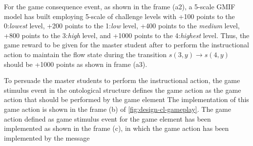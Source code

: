For the game consequence event, as shown in the frame (a2), a 5-scale GMIF model has built employing 5-scale of challenge levels with +100 points to the 0:\emph{lowest} level, +200 points to the 1:\emph{low} level, +400 points to the \emph{medium} level, +800 points to the 3:\emph{high} level, and +1000 points to the 4:\emph{highest} level.
Thus, the game reward to be given for the master student
after to perform the instructional action to maintain the flow state during the transition $s(3,y) \to s(4,y)$ should be
+1000 points as shown in frame (a3).

To persuade the master students to perform the instructional action, the game stimulus event in the ontological structure defines the game action  as the game action that should be performed by the game element 
The implementation of this game action is shown in the frame (b) of \autoref{fig:design-cl-gameplay}.
The game action  defined as game stimulus event for the game element  has been implemented as shown in the frame (c), in which the game action has been implemented by the message 




